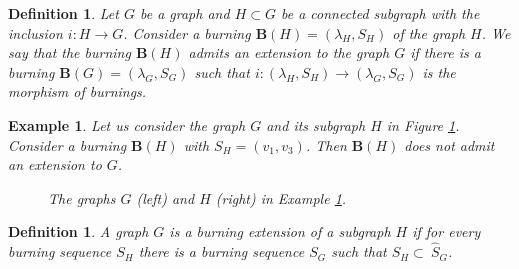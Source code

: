 \documentclass[a4paper, 11pt]{article}
\newtheorem{definition}[theorem]{Definition}
\newtheorem{example}[theorem]{Example}
\begin{document}
\begin{definition}\label{d4.5}\rm Let $G$ be a graph and    $H\subset G$ be a   connected subgraph with the inclusion $i\colon H\to G$. Consider a burning $\mathbf B(H)=(\lambda_H, S_H)$ of the graph $H$. We say that the burning $\mathbf B(H)$ 
\emph{admits an extension } to the  graph $G$  if there is a burning $\mathbf B(G)=(\lambda_G, S_G)$ such that 
$i\colon  (\lambda_H, S_H)\to (\lambda_G, S_G)$ is the morphism 
of burnings. 
\end{definition} 

\begin{example}\label{e4.6} \rm  Let us consider the  graph $G$ and its subgraph $H$ in Figure \ref{Ext}.  Consider a burning   $\mathbf B(H)$  with $S_H=(v_1, v_3)$. Then $\mathbf B(H)$ does not admit an extension to $G$.

\begin{figure}[H]
\centering
{}
  \caption{The graphs $G$ (left) and  $H$ (right) in Example \ref{e4.6}.}
\label{Ext}
\end{figure}
   \end{example} 



\begin{definition}\label{d4.7}\rm A graph $G$ is a \emph{burning extension of a subgraph $H$} if for every burning sequence $S_H$ there is a burning sequence $S_G$ such that $\widehat S_H\subset~\widehat S_G$. 
\end{definition} 
\end{document}
